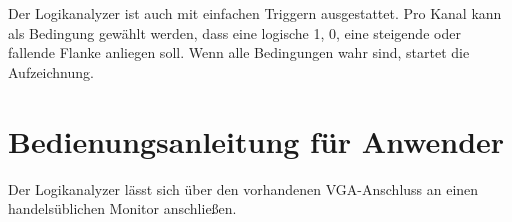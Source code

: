 \documentclass[IN,ngerman,utf8,12pt]{tumbook}
\begin{document}
Der Logikanalyzer ist auch mit einfachen Triggern ausgestattet.
Pro Kanal kann als Bedingung gewählt werden, dass eine logische 1, 0, eine steigende oder fallende Flanke anliegen soll.
Wenn alle Bedingungen wahr sind, startet die Aufzeichnung.

%
%
%
%

\chapter{Bedienungsanleitung für Anwender}

Der Logikanalyzer lässt sich über den vorhandenen VGA-Anschluss an einen handelsüblichen Monitor anschließen.
\end{document}
